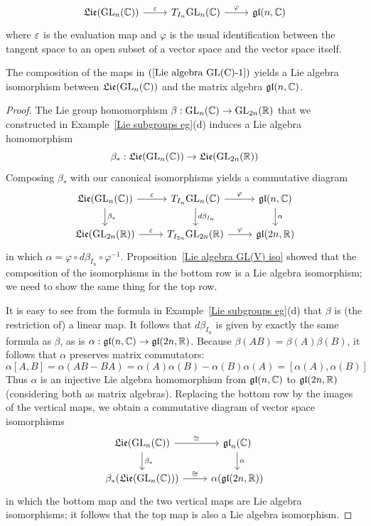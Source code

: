 \begin{equation}\label{Lie algebra GL(C)-1}
\begin{tikzcd}
\Lie(\GL_n(\C))\ar[r,"\eps"]&T_{I_n}\GL_n(\C)\ar[r,"\varphi"]&\gl(n,\C)
\end{tikzcd}
\end{equation}
where $\varepsilon$ is the evaluation map and $\varphi$ is the usual identification between the tangent space to an open subset of a vector space and the vector space itself.
\begin{proposition}
The composition of the maps in $(\ref{Lie algebra GL(C)-1})$ yields a Lie algebra isomorphism between $\mathfrak{Lie}(\mathrm{GL}_n(\mathbb{C}))$ and the matrix algebra $\mathfrak{gl}(n,\mathbb{C})$.
\end{proposition}
\begin{proof}
The Lie group homomorphism $\beta:\mathrm{GL}_n(\mathbb{C})\to\mathrm{GL}_{2n}(\mathbb{R})$ that we constructed
in Example~\ref{Lie subgroups eg}(d) induces a Lie algebra homomorphism
\[\beta_*:\mathfrak{Lie}(\mathrm{GL}_n(\mathbb{C}))\to\mathfrak{Lie}(\mathrm{GL}_{2n}(\mathbb{R}))\]
Composing $\beta_*$ with our canonical isomorphisms yields a commutative diagram
\[\begin{tikzcd}
\Lie(\GL_n(\C))\ar[r,"\eps"]\ar[d,"\beta_*"]&T_{I_n}\GL_n(\C)\ar[r,"\varphi"]\ar[d,"d\beta_{I_{n}}"]&\gl(n,\C)\ar[d,"\alpha"]\\
\Lie(\GL_{2n}(\R))\ar[r,"\eps"]&T_{I_{2n}}\GL_{2n}(\R)\ar[r,"\varphi"]&\gl(2n,\R)
\end{tikzcd}\]
in which $\alpha=\varphi\circ d\beta_{I_n}\circ\varphi^{-1}$. Proposition~\ref{Lie algebra GL(V) iso} showed that the composition of the
isomorphisms in the bottom row is a Lie algebra isomorphism; we need to show the same thing for the top row.\par
It is easy to see from the formula in Example~\ref{Lie subgroups eg}(d) that $\beta$ is (the restriction of) a linear map. It follows that $d\beta_{I_n}$ is given by exactly the same formula as $\beta$, as is $\alpha:\mathfrak{gl}(n,\mathbb{C})\to\mathfrak{gl}(2n,\mathbb{R})$. Because $\beta(AB)=\beta(A)\beta(B)$, it follows that $\alpha$ preserves matrix commutators:
\[\alpha[A,B]=\alpha(AB-BA)=\alpha(A)\alpha(B)-\alpha(B)\alpha(A)=[\alpha(A),\alpha(B)]\]
Thus $\alpha$ is an injective Lie algebra homomorphism from $\mathfrak{gl}(n,\mathbb{C})$ to $\mathfrak{gl}(2n,\mathbb{R})$ (considering both as matrix algebras). Replacing the bottom row by the images of the vertical maps, we obtain a commutative diagram of vector space isomorphisms
\[\begin{tikzcd}
\Lie(\GL_n(\C))\ar[r,"\cong"]\ar[d,"\beta_*"]&\gl_n(\C)\ar[d,"\alpha"]\\
\beta_*(\Lie(\GL_n(\C)))\ar[r,"\cong"]&\alpha(\gl(2n,\R))
\end{tikzcd}\]
in which the bottom map and the two vertical maps are Lie algebra isomorphisms;
it follows that the top map is also a Lie algebra isomorphism.
\end{proof}
